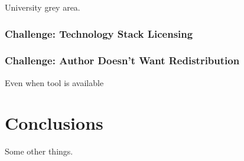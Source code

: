 \documentclass{sig-alternate-05-2015}
\begin{document}
University grey area.

\subsubsection{Challenge: Technology Stack Licensing}

\subsubsection{Challenge: Author Doesn't Want Redistribution}

Even when tool is available

\section{Conclusions}

Some other things.





\end{document}
